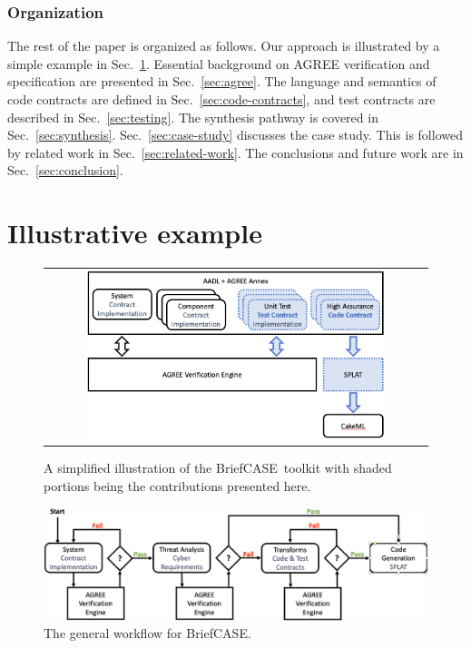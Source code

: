 \documentclass[global,twocolumn]{svjour}
\newcommand{\secref}[1]{Sec.~\ref{#1}}
\newcommand{\brfcs}{BriefCASE}
\newcommand{\agr}{AGREE}
\begin{document}

\subsubsection*{Organization}
The rest of the paper is organized as follows.
%
Our approach is illustrated by a simple example in \secref{sec:example}.
%
Essential background on {\agr} verification and specification are presented in \secref{sec:agree}.
%
The language and semantics of code contracts are defined in \secref{sec:code-contracts}, and test contracts are described in \secref{sec:testing}.
%
The synthesis pathway is covered in \secref{sec:synthesis}.
%
\secref{sec:case-study} discusses the case study.
%
This is followed by related work in \secref{sec:related-work}.
%
The conclusions and future work are in \secref{sec:conclusion}.


\section{Illustrative example}
\label{sec:example}

\begin{figure}
  \begin{center}
    \begin{tabular}{c}
      \includegraphics[width=0.8\textwidth]{flowchart.png} \\
    \end{tabular}
  \end{center}
\caption{A simplified illustration of the \brfcs\ toolkit with shaded portions being the contributions presented here.}
\label{fig:flowchart}
\end{figure}

\begin{figure}
	\begin{center}
	  \includegraphics[width=\textwidth]{./figs/workflow.png}
  	\end{center}
	\caption{The general workflow for \brfcs.}
	\label{fig:workflow}
\end{figure}
\end{document}
